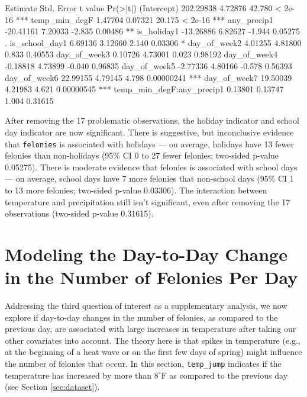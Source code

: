 \documentclass[11pt,notitlepage]{article}
\newenvironment{codeSmall}%
   {\par\noindent\adjustbox{margin=1ex,bgcolor=shadecolor,margin=0ex \medskipamount}\bgroup\minipage\linewidth\verbatim\footnotesize}%
   {\endverbatim\endminipage\egroup}
\newcommand{\degf}{^\circ\text{F}}
\begin{document}
\begin{codeSmall}
                           Estimate Std. Error t value   Pr(>|t|)    
(Intercept)               202.29838    4.72876  42.780    < 2e-16 ***
temp_min_degF               1.47704    0.07321  20.175    < 2e-16 ***
any_precip1               -20.41161    7.20033  -2.835    0.00486 ** 
is_holiday1               -13.26886    6.82627  -1.944    0.05275 .  
is_school_day1              6.69136    3.12660   2.140    0.03306 *  
day_of_week2                4.01255    4.81800   0.833    0.40553    
day_of_week3                0.10726    4.73001   0.023    0.98192    
day_of_week4               -0.18818    4.73899  -0.040    0.96835    
day_of_week5               -2.77336    4.80166  -0.578    0.56393    
day_of_week6               22.99155    4.79145   4.798 0.00000241 ***
day_of_week7               19.50039    4.21983   4.621 0.00000545 ***
temp_min_degF:any_precip1   0.13801    0.13747   1.004    0.31615    
\end{codeSmall}



After removing the 17 problematic observations, the holiday indicator and school day indicator are now significant. There is suggestive, but inconclusive evidence that \texttt{felonies} is associated with holidays --- on average, holidays have 13 fewer felonies than non-holidays (95\% CI 0 to 27 fewer felonies; two-sided p-value 0.05275). There is moderate evidence that felonies is associated with school days --- on average, school days have 7 more felonies that non-school days (95\% CI 1 to 13 more felonies; two-sided p-value 0.03306). The interaction between temperature and precipitation still isn't significant, even after removing the 17 observations (two-sided p-value 0.31615).






\section{Modeling the Day-to-Day Change in the Number of Felonies Per Day}
\label{sec:modelingFeloniesDiff}


Addressing the third question of interest as a supplementary analysis, we now explore if day-to-day changes in the number of felonies, as compared to the previous day, are associated with large increases in temperature after taking our other covariates into account. The theory here is that spikes in temperature (e.g., at the beginning of a heat wave or on the first few days of spring) might influence the number of felonies that occur. In this section, \texttt{temp_jump} indicates if the temperature has increased by more than $8\degf$ as compared to the previous day (see Section \ref{sec:dataset}).
\end{document}
